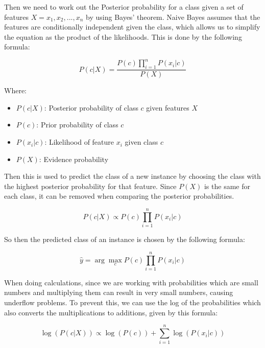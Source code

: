 Then we need to work out the Posterior probability for a class given a set of features $X = x_1, x_2, ..., x_n$ by using Bayes' theorem. Naive Bayes assumes that the features are conditionally independent given the class, which allows us to simplify the equation as the product of the likelihoods. This is done by the following formula:

\begin{equation}
    \label{eq:posterior}
    P(c | X) = \frac {P(c) \prod_{i=1}^{n} P(x_i | c)} {P(X)}
\end{equation}

Where:
\begin{itemize}
    \item $P(c | X)$: Posterior probability of class $c$ given features $X$
    \item $P(c)$: Prior probability of class $c$
    \item $P(x_i | c)$: Likelihood of feature $x_i$ given class $c$
    \item $P(X)$: Evidence probability
\end{itemize}

Then this is used to predict the class of a new instance by choosing the class with the highest posterior probability for that feature. Since $P(X)$ is the same for each class, it can be removed when comparing the posterior probabilities. 

\begin{equation}
    \label{eq:posterior}
    P(c | X) \propto P(c) \prod_{i=1}^{n} P(x_i | c)
\end{equation}

So then the predicted class of an instance is chosen by the following formula:

\begin{equation}
    \label{eq:prediction}
    \hat{y} = \arg\max_{c} P(c) \prod_{i=1}^{n} P(x_i | c)
\end{equation}

When doing calculations, since we are working with probabilities which are small numbers and multiplying them can result in very small numbers, causing underflow problems. To prevent this, we can use the log of the probabilities which also converts the multiplications to additions, given by this formula:

\begin{equation}
    \label{eq:log}
    \log(P(c | X)) \propto \log(P(c)) + \sum_{i=1}^{n} \log(P(x_i | c))
\end{equation}

